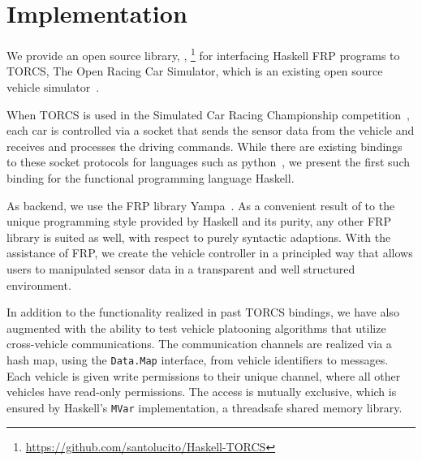 \section{Implementation}

We provide an open source library, \ourLib, \footnote{\url{https://github.com/santolucito/Haskell-TORCS}} for interfacing Haskell FRP programs to TORCS, The Open Racing Car Simulator, which is an existing open source vehicle simulator~\cite{torcs}.

When TORCS is used in the Simulated Car Racing Championship competition~\cite{SCRC}, each car is controlled via a socket that sends the sensor data from the vehicle and receives and processes the driving commands.
While there are existing bindings to these socket protocols for languages such as python~\cite{snakeoil,pyscrc}, we present the first such binding for the functional programming language Haskell.

As backend, we use the FRP library Yampa~\cite{courtney2003yampa}. 
As a convenient result of to the unique programming style provided by Haskell and its purity, any other FRP library is suited as well, with respect to purely syntactic adaptions.
With the assistance of FRP, we create the  vehicle controller in a principled way that allows users to manipulated sensor data in a transparent and well structured environment.



In addition to the functionality realized in past TORCS bindings, we have also augmented \ourLib with the ability to test vehicle platooning algorithms that utilize cross-vehicle communications.
The communication channels are realized via a hash map, using the \texttt{Data.Map} interface, from vehicle identifiers to messages.
Each vehicle is given write permissions to their unique channel, where all other vehicles have read-only permissions.
The access is mutually exclusive, which is ensured by Haskell's \texttt{MVar} implementation, a threadsafe shared memory library. %
